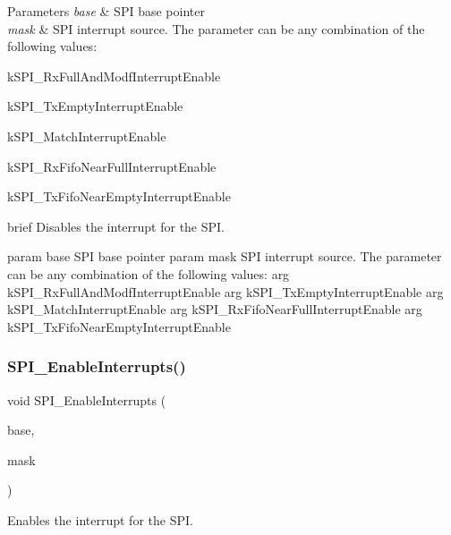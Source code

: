 \begin{DoxyParams}{Parameters}
{\em base} & S\+PI base pointer \\
\hline
{\em mask} & S\+PI interrupt source. The parameter can be any combination of the following values\+: \begin{DoxyItemize}
\item k\+S\+P\+I\+\_\+\+Rx\+Full\+And\+Modf\+Interrupt\+Enable \item k\+S\+P\+I\+\_\+\+Tx\+Empty\+Interrupt\+Enable \item k\+S\+P\+I\+\_\+\+Match\+Interrupt\+Enable \item k\+S\+P\+I\+\_\+\+Rx\+Fifo\+Near\+Full\+Interrupt\+Enable \item k\+S\+P\+I\+\_\+\+Tx\+Fifo\+Near\+Empty\+Interrupt\+Enable\end{DoxyItemize}
brief Disables the interrupt for the S\+PI.\\
\hline
\end{DoxyParams}
param base S\+PI base pointer param mask S\+PI interrupt source. The parameter can be any combination of the following values\+: arg k\+S\+P\+I\+\_\+\+Rx\+Full\+And\+Modf\+Interrupt\+Enable arg k\+S\+P\+I\+\_\+\+Tx\+Empty\+Interrupt\+Enable arg k\+S\+P\+I\+\_\+\+Match\+Interrupt\+Enable arg k\+S\+P\+I\+\_\+\+Rx\+Fifo\+Near\+Full\+Interrupt\+Enable arg k\+S\+P\+I\+\_\+\+Tx\+Fifo\+Near\+Empty\+Interrupt\+Enable \mbox{\label{group__spi__driver_gac12d144816080c40ca86d762e31aacc4}} 
\subsubsection{\texorpdfstring{SPI\_EnableInterrupts()}{SPI\_EnableInterrupts()}}
{\footnotesize\ttfamily void S\+P\+I\+\_\+\+Enable\+Interrupts (\begin{DoxyParamCaption}\item[{\mbox{\hyperlink{struct_s_p_i___type}{S\+P\+I\+\_\+\+Type}} $\ast$}]{base,  }\item[{uint32\+\_\+t}]{mask }\end{DoxyParamCaption})}



Enables the interrupt for the S\+PI. 


